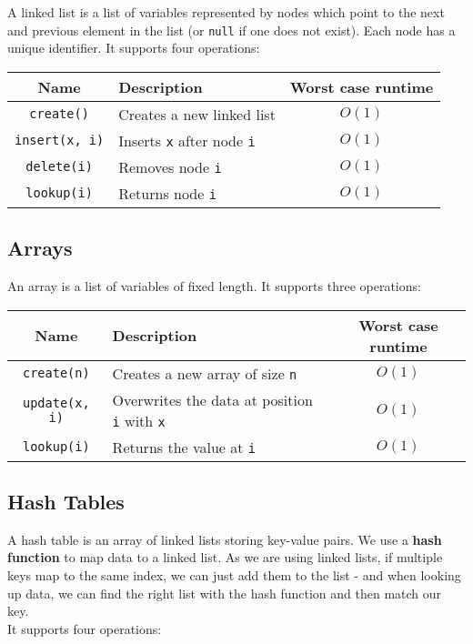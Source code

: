 A linked list is a list of variables represented by nodes which
point to the next and previous element in the list (or \texttt{null} 
if one does not exist). Each node has a unique identifier.
It supports four operations:

\begin{center}
  \begin{tabular}{ || c | p{6.5cm} | c || }
    \hline
    Name & Description & Worst case runtime \\
    \hline
    \texttt{create()} & Creates a new linked list & $O(1)$ \\
    \hline
    \texttt{insert(x, i)} & Inserts \texttt{x} after node \texttt{i} & $O(1)$ \\
    \hline
    \texttt{delete(i)} & Removes node \texttt{i} & $O(1)$ \\
    \hline
    \texttt{lookup(i)} & Returns node \texttt{i} & $O(1)$ \\
    \hline
  \end{tabular}
\end{center}

\subsection{Arrays}

An array is a list of variables of fixed length. 
It supports three operations:

\begin{center}
  \begin{tabular}{ || c | p{6.5cm} | c || }
    \hline
    Name & Description & Worst case runtime \\
    \hline
    \texttt{create(n)} & Creates a new array of size \texttt{n} & $O(1)$ \\
    \hline
    \texttt{update(x, i)} & Overwrites the data at position \texttt{i} with \texttt{x} & $O(1)$ \\
    \hline
    \texttt{lookup(i)} & Returns the value at \texttt{i} & $O(1)$ \\
    \hline
  \end{tabular}
\end{center}

\subsection{Hash Tables}

A hash table is an array of linked lists storing key-value pairs. 
We use a \textbf{hash function} to map data to a linked list. As we 
are using linked lists, if multiple keys map to the same index, 
we can just add them to the list - and when looking up data, we 
can find the right list with the hash function and then match our key.
\\[\baselineskip]
It supports four operations:

